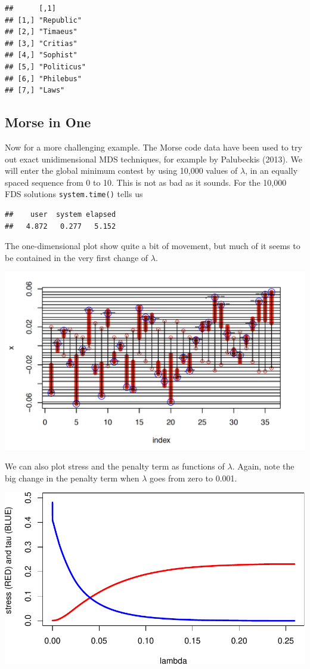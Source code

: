 \documentclass[
  12pt,
]{article}
\begin{document}
\begin{verbatim}
##      [,1]       
## [1,] "Republic" 
## [2,] "Timaeus"  
## [3,] "Critias"  
## [4,] "Sophist"  
## [5,] "Politicus"
## [6,] "Philebus" 
## [7,] "Laws"
\end{verbatim}

\hypertarget{morse-in-one}{%
\subsection{Morse in One}\label{morse-in-one}}

Now for a more challenging example. The Morse code data have been used
to try out exact unidimensional MDS techniques, for example by
Palubeckis (2013). We will enter the global minimum contest by using
10,000 values of \(\lambda\), in an equally spaced sequence from 0 to
10. This is not as bad as it sounds. For the 10,000 FDS solutions
\texttt{system.time()} tells us

\begin{verbatim}
##    user  system elapsed 
##   4.872   0.277   5.152
\end{verbatim}

The one-dimensional plot show quite a bit of movement, but much of it
seems to be contained in the very first change of \(\lambda\).

\begin{center}\includegraphics[width=0.85\linewidth]{morse} \end{center}

We can also plot stress and the penalty term as functions of
\(\lambda\). Again, note the big change in the penalty term when
\(\lambda\) goes from zero to 0.001.

\begin{center}\includegraphics{penalty_files/figure-latex/iter-1} \end{center}
\end{document}
